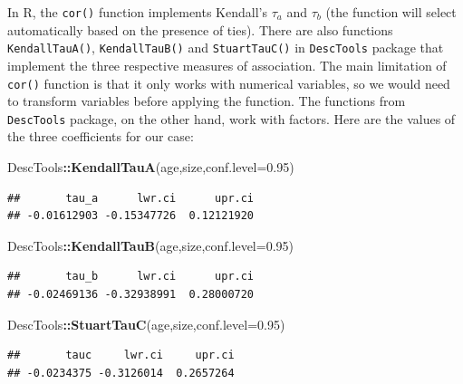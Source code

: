 \documentclass[
]{book}
\newenvironment{Shaded}{\begin{snugshade}}{\end{snugshade}}
\newcommand{\AttributeTok}[1]{\textcolor[rgb]{0.13,0.29,0.53}{#1}}
\newcommand{\FloatTok}[1]{\textcolor[rgb]{0.00,0.00,0.81}{#1}}
\newcommand{\FunctionTok}[1]{\textcolor[rgb]{0.13,0.29,0.53}{\textbf{#1}}}
\newcommand{\NormalTok}[1]{#1}
\newcommand{\SpecialCharTok}[1]{\textcolor[rgb]{0.81,0.36,0.00}{\textbf{#1}}}
\theoremstyle{definition}
\theoremstyle{definition}
\theoremstyle{definition}
\theoremstyle{definition}
\theoremstyle{remark}
\begin{document}
In R, the \texttt{cor()} function implements Kendall's \(\tau_a\) and \(\tau_b\) (the function will select automatically based on the presence of ties). There are also functions \texttt{KendallTauA()}, \texttt{KendallTauB()} and \texttt{StuartTauC()} in \texttt{DescTools} package that implement the three respective measures of association. The main limitation of \texttt{cor()} function is that it only works with numerical variables, so we would need to transform variables before applying the function. The functions from \texttt{DescTools} package, on the other hand, work with factors. Here are the values of the three coefficients for our case:

\begin{Shaded}
\begin{Highlighting}[]
\NormalTok{DescTools}\SpecialCharTok{::}\FunctionTok{KendallTauA}\NormalTok{(age,size,}\AttributeTok{conf.level=}\FloatTok{0.95}\NormalTok{)}
\end{Highlighting}
\end{Shaded}

\begin{verbatim}
##       tau_a      lwr.ci      upr.ci 
## -0.01612903 -0.15347726  0.12121920
\end{verbatim}

\begin{Shaded}
\begin{Highlighting}[]
\NormalTok{DescTools}\SpecialCharTok{::}\FunctionTok{KendallTauB}\NormalTok{(age,size,}\AttributeTok{conf.level=}\FloatTok{0.95}\NormalTok{)}
\end{Highlighting}
\end{Shaded}

\begin{verbatim}
##       tau_b      lwr.ci      upr.ci 
## -0.02469136 -0.32938991  0.28000720
\end{verbatim}

\begin{Shaded}
\begin{Highlighting}[]
\NormalTok{DescTools}\SpecialCharTok{::}\FunctionTok{StuartTauC}\NormalTok{(age,size,}\AttributeTok{conf.level=}\FloatTok{0.95}\NormalTok{)}
\end{Highlighting}
\end{Shaded}

\begin{verbatim}
##       tauc     lwr.ci     upr.ci 
## -0.0234375 -0.3126014  0.2657264
\end{verbatim}
\end{document}
